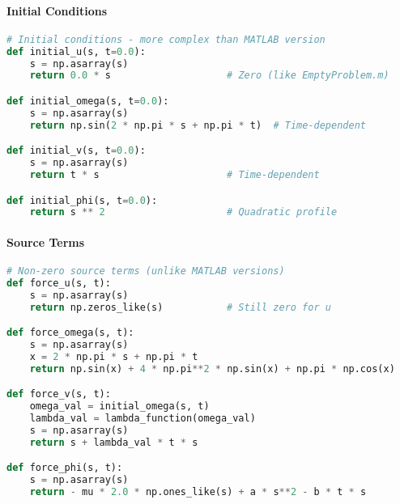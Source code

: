 \paragraph{Initial Conditions}
\begin{lstlisting}[language=Python, caption=Python Initial Conditions]
# Initial conditions - more complex than MATLAB version
def initial_u(s, t=0.0):
    s = np.asarray(s)
    return 0.0 * s                    # Zero (like EmptyProblem.m)

def initial_omega(s, t=0.0):
    s = np.asarray(s)
    return np.sin(2 * np.pi * s + np.pi * t)  # Time-dependent

def initial_v(s, t=0.0):
    s = np.asarray(s)
    return t * s                      # Time-dependent

def initial_phi(s, t=0.0):
    return s ** 2                     # Quadratic profile
\end{lstlisting}

\paragraph{Source Terms}
\begin{lstlisting}[language=Python, caption=Python Source Terms]
# Non-zero source terms (unlike MATLAB versions)
def force_u(s, t):
    s = np.asarray(s)
    return np.zeros_like(s)           # Still zero for u

def force_omega(s, t):
    s = np.asarray(s)
    x = 2 * np.pi * s + np.pi * t
    return np.sin(x) + 4 * np.pi**2 * np.sin(x) + np.pi * np.cos(x)

def force_v(s, t):
    omega_val = initial_omega(s, t)
    lambda_val = lambda_function(omega_val)
    s = np.asarray(s)
    return s + lambda_val * t * s

def force_phi(s, t):
    s = np.asarray(s)
    return - mu * 2.0 * np.ones_like(s) + a * s**2 - b * t * s
\end{lstlisting}

